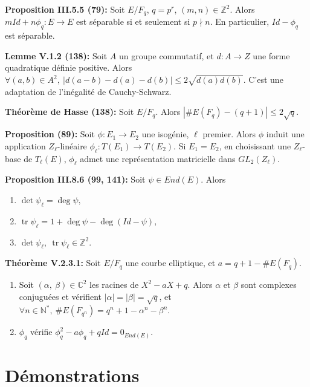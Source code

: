 \documentclass[a4paper,11pt]{article}
\DeclareMathOperator{\tr}{tr}
\begin{document}
\textbf{Proposition III.5.5 (79):} Soit $E/F_q$, $q = p^r$, $(m, n) \in \mathbb{Z}^2$. Alors $mId + n\phi_q: E \to E$ est
séparable si et seulement si $p \nmid n$. En particulier, $Id - \phi_q$ est séparable.
\vspace{5mm}

\textbf{Lemme V.1.2 (138):} Soit $A$ un groupe commutatif, et $d:A \to Z$ une forme quadratique définie positive.
Alors $\forall (a, b) \in A^2,~ |d(a-b) - d(a) - d(b)| \leq 2\sqrt{d(a)d(b)}.$ \newline
C'est une adaptation de l’inégalité de Cauchy-Schwarz.
\vspace{5mm}

\textbf{Théorème de Hasse (138):} Soit $E/F_q$. Alors $|\#E(F_q) - (q+1)| \leq 2\sqrt{q}.$
\vspace{5mm}

\textbf{Proposition (89):} Soit $\phi: E_1 \to E_2$ une isogénie, $\ell$ premier. Alors $\phi$ induit une application
$Z_\ell$-linéaire $\phi_\ell: T(E_1) \to T(E_2)$. Si $E_1 = E_2$, en choisissant une $Z_\ell$-base de $T_\ell(E)$,
$\phi_\ell$ admet une représentation matricielle dans $GL_2(Z_\ell).$
\vspace{5mm}

\pagebreak

\textbf{Proposition III.8.6 (99, 141):} Soit $\psi \in End(E)$. Alors
\begin{enumerate}
	\item $\det \psi_\ell = \deg \psi,$
	\item $\tr \psi_\ell = 1 + \deg \psi - \deg(Id - \psi),$
	\item $\det \psi_\ell,~ \tr \psi_\ell \in \mathbb{Z}^2.$
\end{enumerate}
\vspace{5mm}

\textbf{Théorème V.2.3.1:} Soit $E/F_q$ une courbe elliptique, et $a = q + 1 - \#E(F_q)$.
\begin{enumerate}
	\item Soit $(\alpha,~ \beta) \in \mathbb{C}^2$ les racines de $X^2 - aX + q$. Alors $\alpha$ et $\beta$ sont complexes conjuguées
		et vérifient $|\alpha|=|\beta|=\sqrt q$, et $\forall n \in \mathbb{N}^*,~ \#E(F_{q^n}) = q^n + 1 - \alpha^n - \beta^n.$
	\item $\phi_q$ vérifie $\phi_q^2 - a\phi_q + qId = 0_{End(E)}.$
\end{enumerate}
\vspace{5mm}

\section{Démonstrations}
\end{document}

